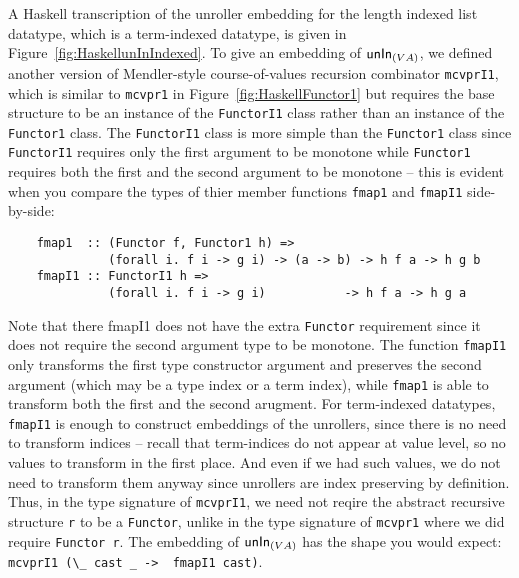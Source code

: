 A Haskell transcription of the unroller embedding for the length indexed
list datatype, which is a term-indexed datatype, is given
in Figure~\ref{fig:HaskellunInIndexed}. To give an embedding of
$\mathsf{unIn}_{(V A)}$, we defined another version of Mendler-style course-of-values
recursion combinator \texttt{mcvprI1}, which is similar to \texttt{mcvpr1}
in Figure~\ref{fig:HaskellFunctor1} but requires the base structure
to be an instance of the \texttt{FunctorI1} class rather than an instance of
the \texttt{Functor1} class. The \texttt{FunctorI1} class is more simple than
the \texttt{Functor1} class since \texttt{FunctorI1} requires only the first
argument to be monotone while \texttt{Functor1} requires both the first and
the second argument to be monotone -- this is evident when you compare
the types of thier member functions \texttt{fmap1} and \texttt{fmapI1}
side-by-side:
\begin{lstlisting}
    fmap1  :: (Functor f, Functor1 h) =>
              (forall i. f i -> g i) -> (a -> b) -> h f a -> h g b
    fmapI1 :: FunctorI1 h =>
              (forall i. f i -> g i)           -> h f a -> h g a
\end{lstlisting}
Note that there fmapI1 does not have the extra \texttt{Functor}
requirement since it does not require the second argument type
to be monotone. The function \texttt{fmapI1} only transforms the first type
constructor argument and preserves the second argument (which may be
a type index or a term index), while \texttt{fmap1} is able to transform
both the first and the second arugment. For term-indexed datatypes,
\texttt{fmapI1} is enough to construct embeddings of the unrollers,
since there is no need to transform indices -- recall that term-indices
do not appear at value level, so no values to transform in the first place.
And even if we had such values, we do not need to transform them anyway
since unrollers are index preserving by definition.
Thus, in the type signature of \texttt{mcvprI1}, we need not reqire
the abstract recursive structure \texttt{r} to be a \texttt{Functor},
unlike in the type signature of \texttt{mcvpr1} where we did require
\texttt{Functor r}. The embedding of $\mathsf{unIn}_{(V A)}$ has the shape
you would expect: \lstinline$mcvprI1 (\_ cast _ ->  fmapI1 cast)$.

